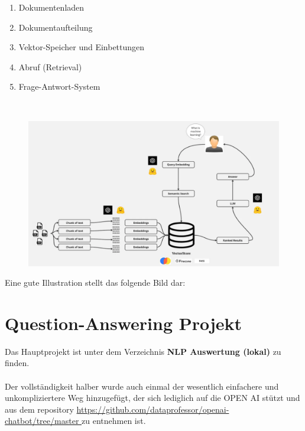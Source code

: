 \documentclass[12pt, a4paper]{article}
\begin{document}
\begin{enumerate}
	\item Dokumentenladen
	\item Dokumentaufteilung
	\item Vektor-Speicher und Einbettungen
	\item Abruf (Retrieval)
	\item Frage-Antwort-System
\end{enumerate}
\ \\ 
\begin{figure}[h]
	\centering
	\includegraphics[width=0.9\linewidth]{images/overview}
\end{figure}

Eine gute Illustration stellt das folgende Bild dar:
\newpage
\ \\
\newpage
\section{Question-Answering Projekt}
Das Hauptprojekt ist unter dem Verzeichnis \textbf{NLP Auswertung (lokal)} zu finden.
\\ \\
Der vollständigkeit halber wurde auch einmal der wesentlich einfachere und unkompliziertere Weg hinzugefügt, der sich lediglich auf die OPEN AI stützt und aus dem repository \url{https://github.com/dataprofessor/openai-chatbot/tree/master
} zu entnehmen ist.
\end{document}
